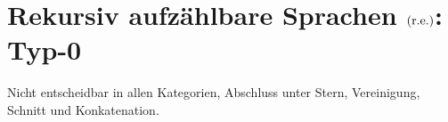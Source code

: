 \chapter{Rekursiv aufzählbare Sprachen $\mathrm{(r.e.)}$: Typ-0}
Nicht entscheidbar in allen Kategorien, Abschluss unter Stern, Vereinigung, Schnitt und Konkatenation.
